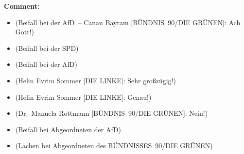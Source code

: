\documentclass{article}
\begin{document}
\noindent\textbf{Comment:}
\begin{itemize}
    \setlength\itemsep{-3pt}
    \item (Beifall bei der AfD – Canan Bayram [BÜNDNIS 90/DIE GRÜNEN]: Ach Gott!)
    \setlength\itemsep{-3pt}
    \item (Beifall bei der SPD)
    \setlength\itemsep{-3pt}
    \item (Beifall bei der AfD)
    \setlength\itemsep{-3pt}
    \item (Helin Evrim Sommer [DIE LINKE]: Sehr großzügig!)
    \setlength\itemsep{-3pt}
    \item (Helin Evrim Sommer [DIE LINKE]: Genau!)
    \setlength\itemsep{-3pt}
    \item (Dr. Manuela Rottmann [BÜNDNIS 90/DIE GRÜNEN]: Nein!)
    \setlength\itemsep{-3pt}
    \item (Beifall bei Abgeordneten der AfD)
    \setlength\itemsep{-3pt}
    \item (Lachen bei Abgeordneten des BÜNDNISSES 90/DIE GRÜNEN)
\end{itemize}
\end{document}
